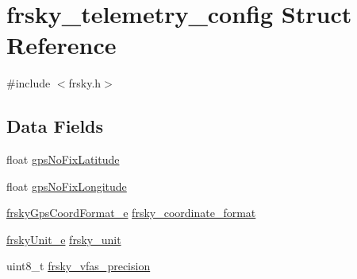 \hypertarget{structfrsky__telemetry__config}{\section{frsky\+\_\+telemetry\+\_\+config Struct Reference}
\label{structfrsky__telemetry__config}
}


{\ttfamily \#include $<$frsky.\+h$>$}

\subsection*{Data Fields}
\begin{DoxyCompactItemize}
\item 
float \hyperlink{structfrsky__telemetry__config_a0b2e70c647b5622579b55f9c4eab392c}{gps\+No\+Fix\+Latitude}
\item 
float \hyperlink{structfrsky__telemetry__config_adc73405ceebaf05d8a676ee3971643e5}{gps\+No\+Fix\+Longitude}
\item 
\hyperlink{config_2frsky_8h_a7fd2f2298dc24a4139e918dc92bc8021}{frsky\+Gps\+Coord\+Format\+\_\+e} \hyperlink{structfrsky__telemetry__config_a2921f88207d5ac4d3e3b31776ad45e22}{frsky\+\_\+coordinate\+\_\+format}
\item 
\hyperlink{config_2frsky_8h_a42cf85b431b983dea7792d5ce4ba207c}{frsky\+Unit\+\_\+e} \hyperlink{structfrsky__telemetry__config_a5b35ba1c27edfc2ddeb1401b5fd0f2b9}{frsky\+\_\+unit}
\item 
uint8\+\_\+t \hyperlink{structfrsky__telemetry__config_a646e8a2b08afa920667d6223673bfcf5}{frsky\+\_\+vfas\+\_\+precision}
\end{DoxyCompactItemize}


